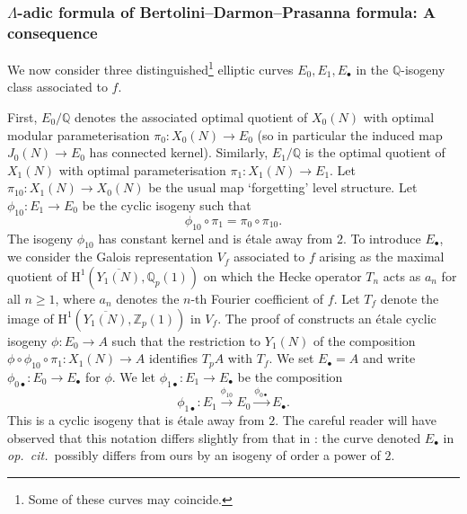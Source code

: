 \documentclass[10pt,reqno]{amsart}
\numberwithin{equation}{section}
\theoremstyle{plain}
\theoremstyle{definition}
\theoremstyle{definition}
\theoremstyle{plain}
\theoremstyle{plain}
\theoremstyle{plain}
\theoremstyle{plain}
\theoremstyle{plain}
\theoremstyle{plain}
\newcommand{\Z}{\mathbb{Z}}
\newcommand{\Q}{\mathbb{Q}}
\newcommand{\rH}{\mathrm{H}}
\begin{document}
\subsubsection{$\Lambda$-adic formula of Bertolini--Darmon--Prasanna formula: A consequence}\label{ss, BDP-f}

We now consider three distinguished\footnote{Some of these curves may coincide.} elliptic curves $E_0, E_1, E_\bullet$ in the $\Q$-isogeny class associated to $f$. 

{ First, $E_0/\Q$ denotes the associated optimal quotient of $X_0(N)$ with optimal modular parameterisation $\pi_0:X_0(N)\rightarrow E_0$ (so in particular the induced map $J_0(N)\rightarrow E_0$ has connected kernel). Similarly, $E_1/\Q$ is the optimal quotient of $X_1(N)$ with optimal parameterisation $\pi_1:X_1(N)\rightarrow E_1$. 
Let $\pi_{10}:X_1(N)\rightarrow X_0(N)$ be the usual map `forgetting' level structure. 
Let $\phi_{10}:E_1\rightarrow E_0$ be the cyclic isogeny such that $$\phi_{10}\circ \pi_1 = \pi_0\circ\pi_{10}.$$  The isogeny $\phi_{10}$ has constant kernel and is \'etale away from $2$.
To introduce $E_\bullet$, we consider the Galois representation $V_f$ associated to $f$ arising as the maximal quotient of $\rH^1(\overline{Y_1(N)},\Q_p(1))$ on which the Hecke operator $T_n$ acts as $a_n$ for all $n\geq 1$, where $a_n$ denotes the $n$-th Fourier coefficient of $f$. 
Let $T_f$ denote the image of $\rH^1(\overline{Y_1(N)},\Z_p(1))$ in $V_f$.  
The proof of \cite[Thm.~4]{wuthrich-int} constructs an \'etale cyclic isogeny $\phi:E_0\rightarrow A$ such that the restriction to $Y_1(N)$ of the composition
$\phi\circ\phi_{10}\circ\pi_1:X_1(N)\rightarrow A$ identifies $T_pA$ with $T_f$.  We set $E_\bullet  = A$ and write $\phi_{0\bullet}:E_0\rightarrow E_\bullet$ for $\phi$.
We let $\phi_{1\bullet}:E_1\rightarrow E_\bullet$ be the composition
\[
\phi_{1\bullet}:E_1\xrightarrow{\phi_{10}} E_0\xrightarrow{\phi_{0\bullet}} E_\bullet.
\]
This is a cyclic isogeny that is \'etale away from $2$.
The careful reader will have observed that this notation differs slightly from that in \cite{wuthrich-int}: the curve denoted $E_\bullet$ in {\em op.~cit.}~possibly differs from ours by an
isogeny of order a power of $2$.}
%
\end{document}

